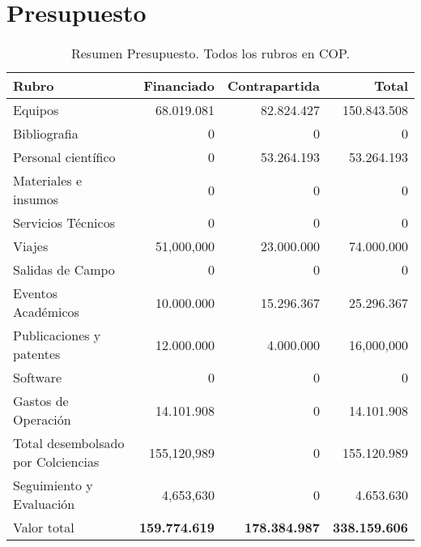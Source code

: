 
\section{Presupuesto}

\begin{table}[h]
\begin{center}
\begin{tabular}{|l|r|r|r|}\hline
\textbf{Rubro} 	& {\bf Financiado} & {\bf Contrapartida} & {\bf Total}\\\hline 
Equipos	& 68.019.081 &	82.824.427 &	150.843.508\\\hline
Bibliografia	&0	&0	&0 \\\hline
Personal científico	&0	&53.264.193	&53.264.193\\\hline
Materiales e insumos	&0	&0	&0\\\hline
Servicios Técnicos	&0	&0	&0\\\hline
Viajes	&51,000,000	&23.000.000	&74.000.000\\\hline
Salidas de Campo	&0	&0	&0\\\hline
Eventos Académicos	&10.000.000	&15.296.367	&25.296.367\\\hline
Publicaciones y patentes&	12.000.000	&4.000.000	&16,000,000\\\hline
Software&	0	&0	&0\\\hline
Gastos de Operación&	14.101.908	&0	&14.101.908\\\hline
Total desembolsado por Colciencias&	155,120,989	&0	&155.120.989\\\hline
Seguimiento y Evaluación&	 4,653,630	&0	&4.653.630\\\hline
Valor total&	{\bf 159.774.619}	& {\bf 178.384.987}	&{\bf 338.159.606}\\\hline

\end{tabular} 
\caption{Resumen Presupuesto. Todos los rubros en COP.}
\end{center}
\label{Resumen Presupuesto}
\end{table}


